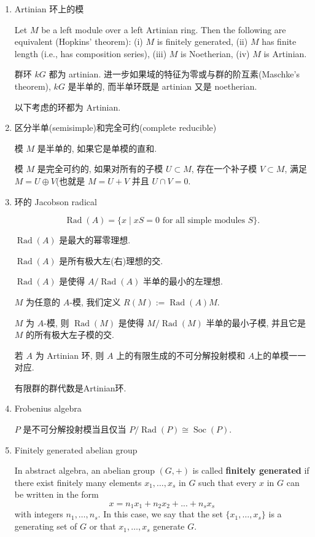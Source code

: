 \documentclass{ctexart}
\DeclareMathOperator{\Soc}{Soc}
\DeclareMathOperator{\Rad}{Rad}
\begin{document}
\begin{enumerate}
\item Artinian 环上的模

Let $M$ be a left module over a left Artinian ring. Then the following are equivalent (Hopkins' theorem): (i) $M$ is finitely generated, (ii) $M$ has finite length (i.e., has composition series), (iii) $M$ is Noetherian, (iv) $M$ is Artinian.

群环 $kG$ 都为 artinian. 进一步如果域的特征为零或与群的阶互素(Maschke's theorem), $kG$ 是半单的, 而半单环既是 artinian 又是 noetherian.

以下考虑的环都为 Artinian.

\item 区分半单(semisimple)和完全可约(complete reducible)

模 $M$ 是半单的, 如果它是单模的直和.

模 $M$ 是完全可约的, 如果对所有的子模 $U\subset M$, 存在一个补子模 $V\subset M$, 满足 $M = U\oplus V$(也就是 $M=U+V$ 并且 $U\cap V = 0$.

\item 环的 Jacobson radical

\[
\Rad(A) = \{ x\mid xS = 0 \text{ for all simple modules } S \}.
\]

$\Rad(A)$ 是最大的幂零理想.

$\Rad(A)$ 是所有极大左(右)理想的交.

$\Rad(A)$ 是使得 $A/\Rad(A)$ 半单的最小的左理想.

$M$ 为任意的 $A$-模, 我们定义 $R(M) := \Rad(A)M$.

$M$ 为 $A$-模, 则 $\Rad(M)$ 是使得 $M/\Rad(M)$ 半单的最小子模, 并且它是 $M$ 的所有极大左子模的交.

若 $A$ 为 Artinian 环, 则 $A$ 上的有限生成的不可分解投射模和 $A$上的单模一一对应.

有限群的群代数是Artinian环.
\item Frobenius algebra

$P$ 是不可分解投射模当且仅当 $P/\Rad(P)\cong \Soc(P)$.

\item Finitely generated abelian group\parencite{finitely_generated_abelian_group}

In abstract algebra, an abelian group $(G, +)$ is called \textbf{finitely generated} if there exist finitely many elements $x_1,\ldots, x_s$ in $G$ such that every $x$ in $G$ can be written in the form
\[
    x = n_1x_1 + n_2x_2 + ... + n_sx_s
\]
with integers $n_1,\ldots, n_s$. In this case, we say that the set $\{x_1,\ldots, x_s\}$ is a generating set of $G$ or that $x_1,\ldots, x_s$ generate $G$.


\end{enumerate}
\end{document}
